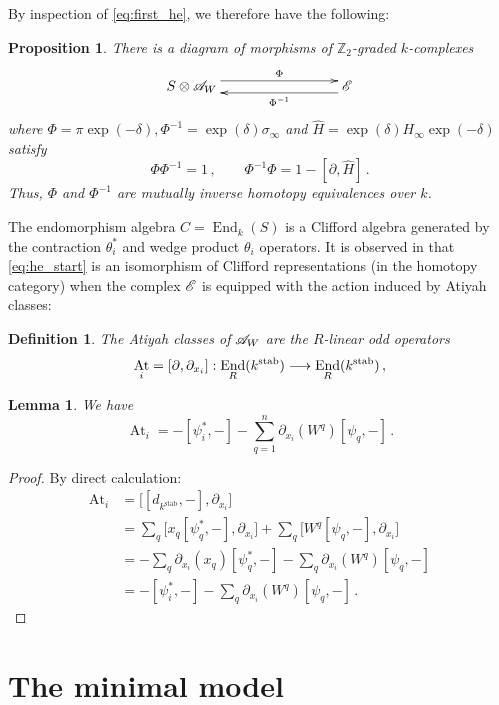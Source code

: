 \documentclass[english,letter paper,12pt,leqno]{article}
\newtheorem{proposition}[theorem]{Proposition}
\newtheorem{lemma}[theorem]{Lemma}
\theoremstyle{example}
\newtheorem{definition}[theorem]{Definition}
\numberwithin{equation}{section}
\def\stab{\operatorname{stab}}
\def\be{\begin{equation}}
\def\ee{\end{equation}}
\def\nZ{\mathds{Z}}
\DeclareMathOperator{\End}{End}
\DeclareMathOperator{\At}{At}
\begin{document}
By inspection of \eqref{eq:first_he}, we therefore have the following:

\begin{proposition}\label{prop:he_start} There is a diagram of morphisms of $\nZ_2$-graded $k$-complexes
\be\label{eq:he_start}
\xymatrix@C+5pc{
S \otimes \md{A}_W \ar@<1ex>[r]^-{\Phi} & \md{E}\ar@<1ex>[l]^-{\Phi^{-1}}
}
\ee
where $\Phi = \pi \exp(-\delta), \Phi^{-1} = \exp(\delta) \sigma_\infty$ and $\widehat{H} = \exp(\delta) H_\infty \exp(-\delta)$ satisfy
\be
\Phi \Phi^{-1} = 1\,, \qquad \Phi^{-1} \Phi = 1 - [\partial, \widehat{H}]\,.
\ee
Thus, $\Phi$ and $\Phi^{-1}$ are mutually inverse homotopy equivalences over $k$.
\end{proposition}

The endomorphism algebra $C = \End_k(S)$ is a Clifford algebra generated by the contraction $\theta_i^*$ and wedge product $\theta_i$ operators. It is observed in \cite{murfet} that \eqref{eq:he_start} is an isomorphism of Clifford representations (in the homotopy category) when the complex $\mathscr{E}$ is equipped with the action induced by Atiyah classes:

\begin{definition}
The Atiyah classes of $\mathscr{A}_W$ are the $R$-linear odd operators
\[
\At_i = [\partial, \partial_{x_i}]: \End_R(k^{\stab}) \lto \End_R(k^{\stab})\,,
\]
\end{definition}

\begin{lemma} We have
\[
\At_i = -[\psi_i^*, -] - \sum_{q=1}^n \partial_{x_i}(W^q) [ \psi_q, - ]\,.
\]
\end{lemma}
\begin{proof}
By direct calculation:
\begin{align*}
\At_i &= \big[ [d_{k^{\stab}},-], \partial_{x_i} \big]\\
&= \sum_q \big[x_q [\psi_q^*,-], \partial_{x_i}\big] + \sum_q \big[W^q [\psi_q,-], \partial_{x_i}\big]\\
&= -\sum_q \partial_{x_i}(x_q) [\psi_q^*,-] - \sum_q \partial_{x_i}(W^q) [\psi_q,-]\\
&= -[\psi_i^*,-] - \sum_q \partial_{x_i}(W^q) [\psi_q, -]\,.
\end{align*}
\end{proof}

\section{The minimal model}
\end{document}
